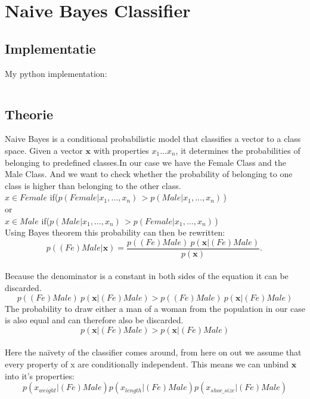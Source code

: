 \documentclass[pdftex,12pt,a4paper]{article}
\begin{document}
\section{Naive Bayes Classifier}
	\subsection{Implementatie}
    	My python implementation:\\
    	\inputminted{python}{NaiveBayes.py}
    \subsection{Theorie}
    	Naive Bayes is a conditional probabilistic model that classifies a
    	vector to a class space. Given a vector $\mathbf{x}$ with properties
    	$x_1...x_n$, it determines the probabilities of belonging to predefined 
    	classes.In our case we have the Female Class and the Male Class.
    	And we want to check whether the probability of belonging to one class
    	is higher than belonging to the other class.\\
    	$x \in Female$ if($p(Female \vert x_1, \dots, x_n)\, > p(Male \vert x_1, \dots, x_n)\,$)\\
    	or\\
    	$x \in Male$ if($p(Male \vert x_1, \dots, x_n)\, > p(Female \vert x_1, \dots, x_n)\,$)\\
    	Using Bayes theorem this probability can then be rewritten:\\
    	$$ p((Fe)Male \vert \mathbf{x}) = \frac{p((Fe)Male) \ p(\mathbf{x} \vert
    	(Fe)Male)}{p(\mathbf{x})}. \,$$\\
    	Because the denominator is a constant in both sides of the equation it
    	can be discarded.\\
    	$$p((Fe)Male) \ p(\mathbf{x} \vert (Fe)Male) > p((Fe)Male) \
    	p(\mathbf{x} \vert (Fe)Male)$$
    	The probability to draw either a man of a woman from the population in
    	our case is also equal and can therefore also be discarded.\\
    	$$p(\mathbf{x} \vert (Fe)Male) > p(\mathbf{x} \vert (Fe)Male)$$\\
    	Here the naïvety of the classifier comes around, from here on out we
    	assume that every property of x are conditionally independent. This
    	means we can unbind $\mathbf{x}$ into it's properties:\\
    	$$p(x_{weight} \vert (Fe)Male)p(x_{length} \vert (Fe)Male)
    	p(x_{shoe\_size} \vert (Fe)Male)$$\\
    	
\end{document}
